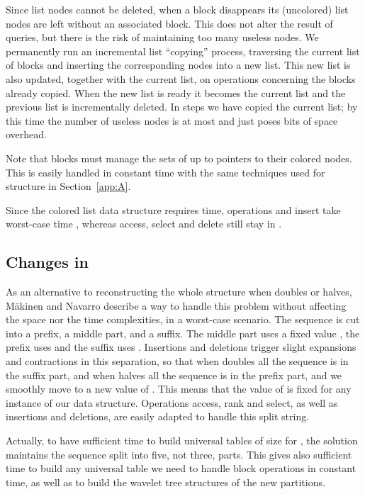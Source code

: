 \documentclass[11pt]{article}
\begin{document}
Since list nodes cannot be deleted, when a block disappears its (uncolored)
list nodes are left without an associated block. This does not alter the result
of queries, but there is the risk of maintaining too many
useless nodes. We permanently run an incremental list
``copying'' process, traversing the current list of blocks and inserting the
corresponding nodes into a new list. This new list is also updated, together
with the current list, on operations concerning the blocks already copied.
When the new list is ready it becomes
the current list and the previous list is incrementally deleted. In
 steps we have copied the current list; by this time the
number of useless nodes is at most  and just poses 
 bits of space overhead.

Note that blocks must manage the sets of up to  pointers to their
colored nodes. This is easily handled in constant time with the same
techniques used for structure  in Section~\ref{app:A}.

Since the colored list data structure requires  time,
operations  and insert take worst-case time , 
whereas access, select and delete still stay in .

\subsection{Changes in }

As an alternative to reconstructing the whole structure when  doubles
or halves, M\"akinen and
Navarro \cite{MN08} describe a way to handle this problem without affecting
the space nor the time complexities, in a worst-case scenario.
The sequence is cut into a prefix, a middle part, and a suffix. The middle
part uses a fixed value , the prefix uses  and the suffix uses . Insertions and deletions
trigger slight expansions and contractions in this separation, so that when
 doubles all the sequence is in the suffix part, and when  halves all
the sequence is in the prefix part, and we smoothly move to a new value of
. This means that the value of  is fixed for any instance of our
data structure. Operations access, rank and select, as well as insertions
and deletions, are easily adapted to handle this split string.

Actually, to have sufficient time to build universal tables of size 
 for , the solution \cite{MN08} maintains the sequence
split into five, not three, parts. This gives also sufficient time to build
any universal table we need to handle block operations in constant time, as
well as to build the wavelet tree structures of the new partitions.
\end{document}
